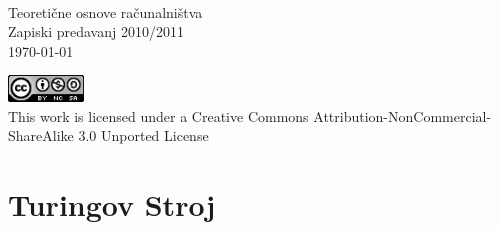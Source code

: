 \documentclass[10pt,a4paper,oneside]{book}
\begin{document}
\begin{titlepage}
\begin{center}
\ \\[8cm]
{\huge Teoretične osnove računalništva}\\[1.5pt]
{\large Zapiski predavanj 2010/2011}\\[15pt]
{\large \today}
\vfill

\parbox{7.5cm}{
\begin{center}
\includegraphics[width=0.15\textwidth]{./CC}\\[5pt]

This work is licensed under a Creative Commons Attribution-NonCommercial-ShareAlike 3.0 Unported License
\end{center}
}
\end{center}
\end{titlepage}
\tableofcontents
\pagebreak
\chapter{Turingov Stroj}
\end{document}
